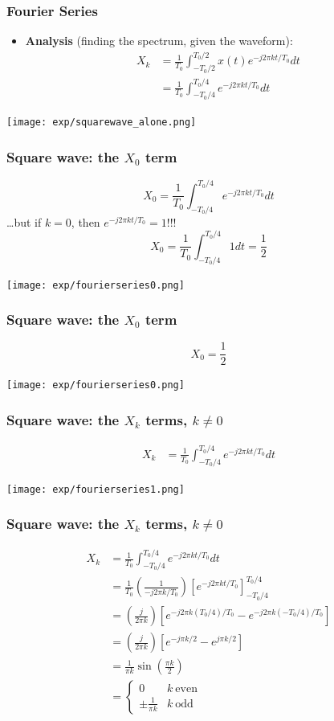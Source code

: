 \documentclass{beamer}
\begin{document}
\begin{frame}
  \frametitle{Fourier Series}

  \begin{itemize}
  \item {\bf Analysis}  (finding the spectrum, given the waveform):
    \begin{align*}
    X_k &= \frac{1}{T_0}\int_{-T_0/2}^{T_0/2} x(t)e^{-j2\pi kt/T_0}dt\\
    &= \frac{1}{T_0}\int_{-T_0/4}^{T_0/4} e^{-j2\pi kt/T_0}dt
    \end{align*}
  \end{itemize}
  \centerline{\texttt{[image: exp/squarewave\_alone.png]}}
  
\end{frame}

\begin{frame}
  \frametitle{Square wave: the $X_0$ term}
    \[
    X_0 = \frac{1}{T_0}\int_{-T_0/4}^{T_0/4} e^{-j2\pi k t/T_0}dt
    \]
    \ldots but if $k=0$, then $e^{-j2\pi kt/T_0}=1$!!!
    \[
    X_0=\frac{1}{T_0}\int_{-T_0/4}^{T_0/4} 1 dt=\frac{1}{2}
    \]
    \centerline{\texttt{[image: exp/fourierseries0.png]}}
\end{frame}

\begin{frame}
  \frametitle{Square wave: the $X_0$ term}
    \[
    X_0 = \frac{1}{2}
    \]
    \centerline{\texttt{[image: exp/fourierseries0.png]}}
\end{frame}

\begin{frame}
  \frametitle{Square wave: the $X_k$ terms, $k\ne 0$}
  \begin{align*}
  X_k &= \frac{1}{T_0}\int_{-T_0/4}^{T_0/4} e^{-j2\pi k t/T_0}dt
  \end{align*}
  \centerline{\texttt{[image: exp/fourierseries1.png]}}
\end{frame}

\begin{frame}
  \frametitle{Square wave: the $X_k$ terms, $k\ne 0$}
  \begin{align*}
    X_k &= \frac{1}{T_0}\int_{-T_0/4}^{T_0/4} e^{-j2\pi k t/T_0}dt\\
    &= \frac{1}{T_0}\left(\frac{1}{-j2\pi k/T_0}\right)\left[e^{-j2\pi k t/T_0}\right]_{-T_0/4}^{T_0/4}\\
    &= \left(\frac{j}{2\pi k}\right)\left[e^{-j2\pi k (T_0/4)/T_0}-e^{-j2\pi k (-T_0/4)/T_0}\right]\\
    &= \left(\frac{j}{2\pi k}\right)\left[e^{-j\pi k/2}-e^{j\pi k/2}\right]\\
    &= \frac{1}{\pi k}\sin\left(\frac{\pi k}{2}\right)\\
    &= \left\{\begin{array}{ll}
    0 & k~\mbox{even}\\
    \pm\frac{1}{\pi k} & k~\mbox{odd}
    \end{array}\right.
  \end{align*}
\end{frame}
\end{document}
